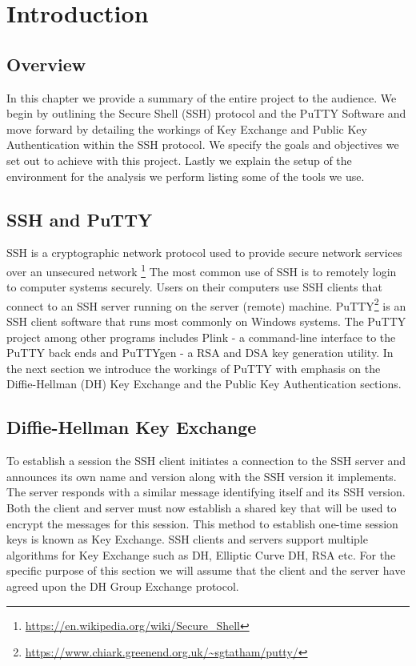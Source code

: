 \documentclass{bhamthesis}
\begin{document}
\chapter{Introduction}
\section{Overview}
In this chapter we provide a summary of the entire project to the audience. We begin by outlining the Secure Shell (SSH) protocol and the PuTTY Software and move forward by detailing the workings of Key Exchange and Public Key Authentication within the SSH protocol. We specify the goals and objectives we set out to achieve with this project. Lastly we explain the setup of the environment for the analysis we perform listing some of the tools we use.

\section{SSH and PuTTY}
SSH is a cryptographic network protocol used to provide secure network services over an unsecured network
\footnote{\url{https://en.wikipedia.org/wiki/Secure_Shell}}
The most common use of SSH is to remotely login to computer systems securely. Users on their computers use SSH clients that connect to an SSH server running on the server (remote) machine. PuTTY\footnote{\url{https://www.chiark.greenend.org.uk/~sgtatham/putty/}} is an SSH client software that runs most commonly on Windows systems. The PuTTY project among other programs includes Plink - a command-line interface to the PuTTY back ends and PuTTYgen - a RSA and DSA key generation utility. In the next section we introduce the workings of PuTTY with emphasis on the Diffie-Hellman (DH) Key Exchange and the Public Key Authentication sections.
\section{Diffie-Hellman Key Exchange}
To establish a session the SSH client initiates a connection to the SSH server and announces its own name and version along with the SSH version it implements. The server responds with a similar message identifying itself and its SSH version. Both the client and server must now establish a shared key that will be used to encrypt the messages for this session. This method to establish one-time session keys is known as Key Exchange. SSH clients and servers support multiple algorithms for Key Exchange \cite{rfc4253} such as DH, Elliptic Curve DH, RSA etc. For the specific purpose of this section we will assume that the client and the server have agreed upon the DH Group Exchange protocol.\par
\end{document}
